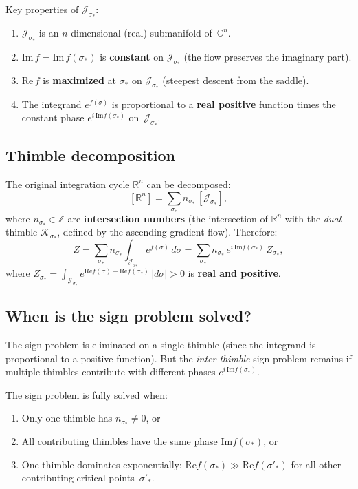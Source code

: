 \documentclass[12pt]{article}
\theoremstyle{definition}
\theoremstyle{remark}
\newcommand{\R}{\mathbb{R}}
\newcommand{\C}{\mathbb{C}}
\newcommand{\Z}{\mathbb{Z}}
\newcommand{\im}{\mathrm{Im}}
\newcommand{\re}{\mathrm{Re}}
\begin{document}
Key properties of $\mathcal{J}_{\sigma_*}$:
\begin{enumerate}
\item $\mathcal{J}_{\sigma_*}$ is an $n$-dimensional (real)
  submanifold of~$\C^n$.
\item $\im\,f = \im\,f(\sigma_*)$ is \textbf{constant} on
  $\mathcal{J}_{\sigma_*}$ (the flow preserves the imaginary part).
\item $\re\,f$ is \textbf{maximized} at $\sigma_*$ on
  $\mathcal{J}_{\sigma_*}$ (steepest descent from the saddle).
\item The integrand $e^{f(\sigma)}$ is proportional to a
  \textbf{real positive} function times the constant phase
  $e^{i\,\im f(\sigma_*)}$ on~$\mathcal{J}_{\sigma_*}$.
\end{enumerate}

\subsection{Thimble decomposition}

The original integration cycle $\R^n$ can be decomposed:
\begin{equation}\label{eq:thimble_decomp}
  [\R^n] = \sum_{\sigma_*} n_{\sigma_*}\,[\mathcal{J}_{\sigma_*}],
\end{equation}
where $n_{\sigma_*} \in \Z$ are \textbf{intersection numbers}
(the intersection of $\R^n$ with the \emph{dual} thimble
$\mathcal{K}_{\sigma_*}$, defined by the ascending gradient flow).
Therefore:
\begin{equation}
  Z = \sum_{\sigma_*} n_{\sigma_*} \int_{\mathcal{J}_{\sigma_*}}
    e^{f(\sigma)}\,d\sigma
  = \sum_{\sigma_*} n_{\sigma_*}\,e^{i\,\im f(\sigma_*)}\,
    Z_{\sigma_*},
\end{equation}
where $Z_{\sigma_*} = \int_{\mathcal{J}_{\sigma_*}}
e^{\re f(\sigma) - \re f(\sigma_*)}\,|d\sigma| > 0$ is
\textbf{real and positive}.

\subsection{When is the sign problem solved?}

The sign problem is eliminated on a single thimble (since the integrand
is proportional to a positive function). But the \emph{inter-thimble}
sign problem remains if multiple thimbles contribute with different
phases $e^{i\,\im f(\sigma_*)}$.

The sign problem is fully solved when:
\begin{enumerate}
\item[(a)] Only one thimble has $n_{\sigma_*} \ne 0$, or
\item[(b)] All contributing thimbles have the same phase
  $\im f(\sigma_*)$, or
\item[(c)] One thimble dominates exponentially:
  $\re f(\sigma_*) \gg \re f(\sigma'_*)$ for all other
  contributing critical points~$\sigma'_*$.
\end{enumerate}
\end{document}
